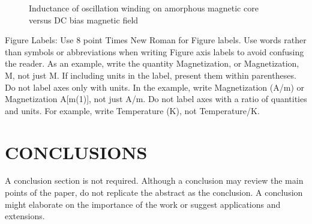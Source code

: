 \documentclass[letterpaper, 10 pt, conference]{ieeeconf}  %
\begin{document}
   \begin{figure}[thpb]
      \centering
      \caption{Inductance of oscillation winding on amorphous
       magnetic core versus DC bias magnetic field}
      \label{figurelabel}
   \end{figure}


Figure Labels: Use 8 point Times New Roman for Figure labels. Use words rather than symbols or abbreviations when writing Figure axis labels to avoid confusing the reader. As an example, write the quantity Magnetization, or Magnetization, M, not just M. If including units in the label, present them within parentheses. Do not label axes only with units. In the example, write Magnetization (A/m) or Magnetization {A[m(1)]}, not just A/m. Do not label axes with a ratio of quantities and units. For example, write Temperature (K), not Temperature/K.

\section{CONCLUSIONS}

A conclusion section is not required. Although a conclusion may review the main points of the paper, do not replicate the abstract as the conclusion. A conclusion might elaborate on the importance of the work or suggest applications and extensions.

\addtolength{\textheight}{-12cm}   %




\end{document}
